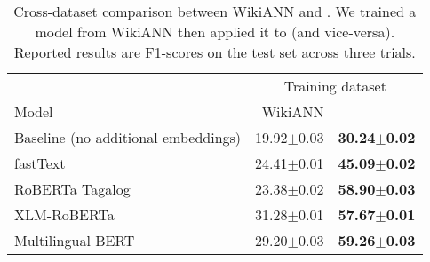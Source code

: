 \documentclass[../report.tex]{subfiles}
\begin{document}
\begin{table*}[t]
\centering
{
\begin{tabular}{@{}lrr@{}}
\toprule
           & \multicolumn{2}{c}{Training dataset} \\ \cmidrule{2-3}
Model      & WikiANN   & \tlunified{}             \\ \midrule
Baseline (no additional embeddings)          & 19.92$\pm$0.03 & \textbf{30.24$\pm$0.02}  \\ 
fastText  \cite{Bojanowski2016EnrichingWV}   & 24.41$\pm$0.01 & \textbf{45.09$\pm$0.02}  \\ 
RoBERTa Tagalog \cite{Cruz2021ImprovingLL}   & 23.38$\pm$0.02 & \textbf{58.90$\pm$0.03}  \\
XLM-RoBERTa \cite{Conneau2019UnsupervisedCR} & 31.28$\pm$0.01 & \textbf{57.67$\pm$0.01}  \\
Multilingual BERT \cite{Devlin2019BERTPO}    & 29.20$\pm$0.03 & \textbf{59.26$\pm$0.03}  \\
\bottomrule
\end{tabular}

}

\caption{
    Cross-dataset comparison between WikiANN \citep{Pan2017CrosslingualNT} and \tlunified{}. 
    We trained a model from WikiANN then applied it to \tlunified{} (and vice-versa).
    Reported results are F1-scores on the test set across three trials.
}
\label{table:results_wikiann}
\end{table*}
\end{document}
